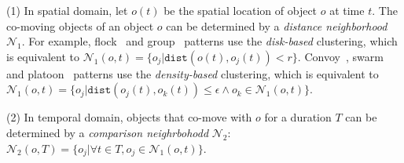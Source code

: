 	(1) In spatial domain, let $o(t)$ be the spatial location of object $o$ at time $t$. The co-moving objects of an object $o$
	can be determined by a \emph{distance neighborhood} $\mathcal{N}_1$. For example,  flock~\cite{gudmundsson2006computing} and group~\cite{wang2006grouppattern} patterns use the \emph{disk-based} clustering, which is equivalent to $\mathcal{N}_1(o, t)= \{o_j | \mathtt{dist}(o(t),o_j(t)) < r \}$. Convoy~\cite{jeung2008discovery}, swarm~\cite{li2010swarm} and platoon~\cite{li2015platoon} patterns use the \emph{density-based} clustering, which is equivalent to $\mathcal{N}_1(o,t)= \{o_j | \mathtt{dist}(o_j(t),o_k(t)) \leq \epsilon \wedge o_k \in \mathcal{N}_1(o,t)\}$.
%	
%	
%	
	
	(2) In temporal domain, objects that co-move with $o$ for a duration $T$ can be determined by
	a \emph{comparison neighrbohodd} $\mathcal{N}_2$:
	$\mathcal{N}_2(o, T)=\{o_j| \forall t \in T, o_j \in \mathcal{N}_1(o,t) \}$.%

